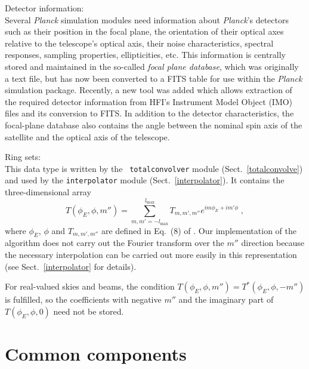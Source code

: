 \documentclass{aa}
\begin{document}
\begin{description}
  \item {Detector information:}\\ Several \emph{Planck} simulation
    modules need information about \emph{Planck}'s detectors such as
    their position in the focal plane, the orientation of their
    optical axes relative to the telescope's optical axis, their noise
    characteristics, spectral responses, sampling properties,
    ellipticities, etc. This information is centrally stored and
    maintained in the so-called \emph{focal plane database}, which was
    originally a text file, but has now been converted to a FITS table
    for use within the \emph{Planck} simulation package. Recently, a
    new tool was added which allows extraction of the required detector
    information from HFI's Instrument Model Object (IMO) files and its
    conversion to FITS.
    In addition to the detector characteristics, the focal-plane
    database also contains the angle between the nominal spin axis of the
    satellite and the optical axis of the telescope.\\

  \item {Ring sets:}\\ This data type is written by the {\tt
    totalconvolver} module (Sect.\ \ref{totalconvolve}) and used by
    the {\tt interpolator} module (Sect.\ \ref{interpolator}). It
    contains the three-dimensional array
    \begin{equation}
      T(\phi_E,\phi,m'')=\sum_{m,m'=-l_{\text{max}}}^{l_{\text{max}}}
      T_{m,m',m''}e^{i m \phi_E + i m' \phi}\;,
    \end{equation}
    where $\phi_E$, $\phi$ and $T_{m,m',m''}$ are defined in Eq.~(8) of
    \cite{wandelt-gorski-2001}. Our implementation of the algorithm does
    not carry out the Fourier
    transform over the $m''$ direction because the necessary
    interpolation can be carried out more easily in this
    representation (see Sect.\ \ref{interpolator} for details).

    For real-valued skies and beams, the condition
    $T(\phi_E,\phi,m'')=T^*(\phi_E,\phi,-m'')$ is fulfilled, so the
    coefficients with negative $m''$ and the imaginary part of
    $T(\phi_E,\phi,0)$ need not be stored.
\end{description}

\section {Common components}
\label{commonalities}
\end{document}
